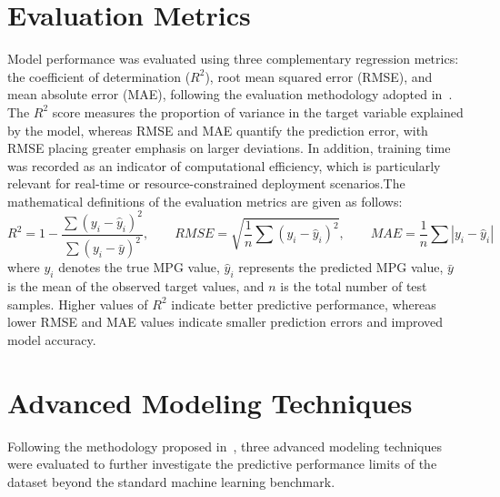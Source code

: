 \section{Evaluation Metrics}

Model performance was evaluated using three complementary regression metrics: the coefficient of determination ($R^2$), root mean squared error (RMSE), and mean absolute error (MAE), following the evaluation methodology adopted in~\cite{atique2026explainable}. The $R^2$ score measures the proportion of variance in the target variable explained by the model, whereas RMSE and MAE quantify the prediction error, with RMSE placing greater emphasis on larger deviations. In addition, training time was recorded as an indicator of computational efficiency, which is particularly relevant for real-time or resource-constrained deployment scenarios.The mathematical definitions of the evaluation metrics are given as follows:
\begin{equation}
R^2 = 1 - \frac{\sum (y_i-\hat{y}_i)^2}
{\sum (y_i-\bar{y})^2},
\qquad
RMSE = \sqrt{\frac{1}{n}\sum (y_i-\hat{y}_i)^2},
\qquad
MAE = \frac{1}{n}\sum |y_i-\hat{y}_i|
\end{equation}
where $y_i$ denotes the true MPG value, $\hat{y}_i$ represents the predicted MPG value, $\bar{y}$ is the mean of the observed target values, and $n$ is the total number of test samples. Higher values of $R^2$ indicate better predictive performance, whereas lower RMSE and MAE values indicate smaller prediction errors and improved model accuracy.




\section{Advanced Modeling Techniques}

Following the methodology proposed in~\cite{atique2026explainable}, three advanced modeling techniques were evaluated to further investigate the predictive performance limits of the dataset beyond the standard machine learning benchmark.

